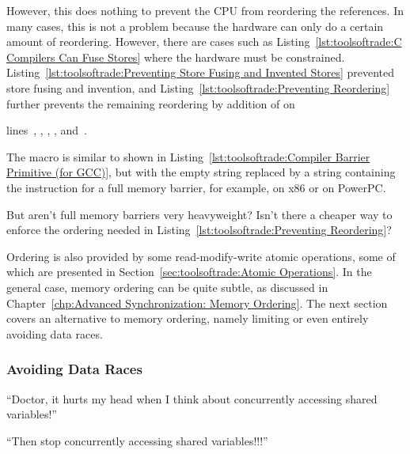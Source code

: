 However, this does nothing to prevent the CPU from reordering the
references.
In many cases, this is not a problem because the hardware can only do
a certain amount of reordering.
However, there are cases such as
Listing~\ref{lst:toolsoftrade:C Compilers Can Fuse Stores} where the
hardware must be constrained.
Listing~\ref{lst:toolsoftrade:Preventing Store Fusing and Invented Stores}
prevented store fusing and invention, and
Listing~\ref{lst:toolsoftrade:Preventing Reordering}
further prevents the remaining reordering by addition of
 on
\begin{lineref}
lines~, , , ,
and~.
\end{lineref}
The  macro is similar to  shown in
Listing~\ref{lst:toolsoftrade:Compiler Barrier Primitive (for GCC)},
but with the empty string replaced by a string containing the
instruction for a full memory barrier, for example, 
on x86 or  on PowerPC.

\QuickQuiz{}
	But aren't full memory barriers very heavyweight?
	Isn't there a cheaper way to enforce the ordering needed in
	Listing~\ref{lst:toolsoftrade:Preventing Reordering}?
 \QuickQuizEnd

Ordering is also provided by some read-modify-write atomic
operations, some of which are presented in
Section~\ref{sec:toolsoftrade:Atomic Operations}.
In the general case, memory ordering can be quite subtle, as
discussed in
Chapter~\ref{chp:Advanced Synchronization: Memory Ordering}.
The next section covers an alternative to memory ordering, namely
limiting or even entirely avoiding data races.

\subsubsection{Avoiding Data Races}
\label{sec:toolsoftrade:Avoiding Data Races}

``Doctor, it hurts my head when I think about concurrently accessing
shared variables!''

``Then stop concurrently accessing shared variables!!!''


